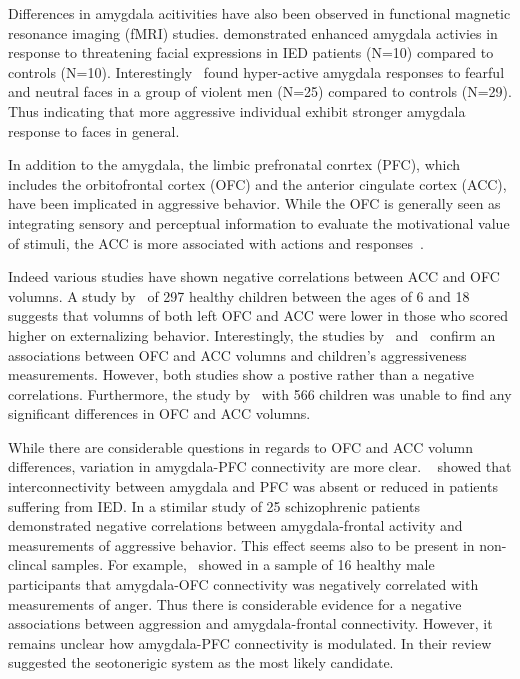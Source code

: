 Differences in amygdala acitivities have also been observed in functional magnetic resonance imaging (fMRI) studies.
\citet{Coccaro2007} demonstrated enhanced amygdala activies in response to threatening facial expressions in IED patients (N=10) compared to controls (N=10).
Interestingly~\citet{Bobes2013} found hyper-active amygdala responses to fearful and neutral faces in a group of violent men (N=25) compared to controls (N=29). 
Thus indicating that more aggressive individual exhibit stronger amygdala response to faces in general.

In addition to the amygdala, the limbic prefronatal conrtex (PFC), which includes the orbitofrontal cortex (OFC) and the anterior cingulate cortex (ACC), have been implicated in aggressive behavior.
While the OFC is generally seen as integrating sensory and perceptual information to evaluate the motivational value of stimuli, the ACC is more associated with actions and responses~\cite{Rudebeck2014,Walton2007}.

Indeed various studies have shown negative correlations between ACC and OFC volumns.
A study by~\citet{Ameis2014} of 297 healthy children between the ages of 6 and 18 suggests that volumns of both left OFC and ACC were lower in those who scored higher on externalizing behavior.
Interestingly, the studies by~\citet{Ducharme2011} and~\citet{Boes2008} confirm an associations between OFC and ACC volumns and children's aggressiveness measurements.
However, both studies show a postive rather than a negative correlations.
Furthermore, the study by~\citet{Thijssen2015} with 566 children was unable to find any significant differences in OFC and ACC volumns.

While there are considerable questions in regards to OFC and ACC volumn differences, variation in amygdala-PFC connectivity are more clear.
~\citet{Coccaro2007} showed that interconnectivity between amygdala and PFC was absent or reduced in patients suffering from IED.
In a stimilar study of 25 schizophrenic patients~\citet{Hoptman2010} demonstrated negative correlations between amygdala-frontal activity and measurements of aggressive behavior.
This effect seems also to be present in non-clincal samples.
For example,~\citet{Fulwiler2012} showed in a sample of 16 healthy male participants that amygdala-OFC connectivity was negatively correlated with measurements of anger. 
Thus there is considerable evidence for a negative associations between aggression and amygdala-frontal connectivity.
However, it remains unclear how amygdala-PFC connectivity is modulated.
In their review~\citet{Rosell2015} suggested the seotonerigic system as the most likely candidate.

